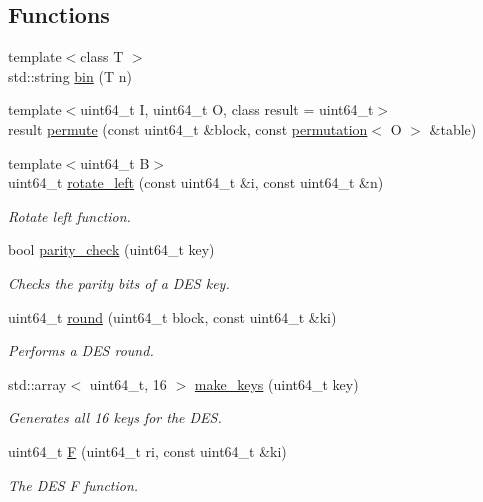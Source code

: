 \subsection*{Functions}
\begin{DoxyCompactItemize}
\item 
{\footnotesize template$<$class T $>$ }\\std\+::string \hyperlink{namespacedes64_1_1__internal_af81bec8ba2078259ef38dfb1950de3be}{bin} (T n)
\item 
{\footnotesize template$<$uint64\+\_\+t I, uint64\+\_\+t O, class result  = uint64\+\_\+t$>$ }\\result \hyperlink{namespacedes64_1_1__internal_a8a0bc78f468c93468b00ca7c5594a74a}{permute} (const uint64\+\_\+t \&block, const \hyperlink{namespacedes64_1_1__internal_a5b829bc1e22d70ed35b925f8971a88d3}{permutation}$<$ O $>$ \&table)
\item 
{\footnotesize template$<$uint64\+\_\+t B$>$ }\\uint64\+\_\+t \hyperlink{namespacedes64_1_1__internal_a41e4978bac83141046373b58c10aab2a}{rotate\+\_\+left} (const uint64\+\_\+t \&i, const uint64\+\_\+t \&n)
\begin{DoxyCompactList}\small\item\em Rotate left function. \end{DoxyCompactList}\item 
bool \hyperlink{namespacedes64_1_1__internal_ab820f987d21e8c13cf82b92da7c16f04}{parity\+\_\+check} (uint64\+\_\+t key)
\begin{DoxyCompactList}\small\item\em Checks the parity bits of a D\+ES key. \end{DoxyCompactList}\item 
uint64\+\_\+t \hyperlink{namespacedes64_1_1__internal_a4282083363bd055e073991d7f4648f47}{round} (uint64\+\_\+t block, const uint64\+\_\+t \&ki)
\begin{DoxyCompactList}\small\item\em Performs a D\+ES round. \end{DoxyCompactList}\item 
std\+::array$<$ uint64\+\_\+t, 16 $>$ \hyperlink{namespacedes64_1_1__internal_ae4c78065cbc23afe4cf03230a6ce7215}{make\+\_\+keys} (uint64\+\_\+t key)
\begin{DoxyCompactList}\small\item\em Generates all 16 keys for the D\+ES. \end{DoxyCompactList}\item 
uint64\+\_\+t \hyperlink{namespacedes64_1_1__internal_a8b8c4ad23172ef52296a16de0963fafb}{F} (uint64\+\_\+t ri, const uint64\+\_\+t \&ki)
\begin{DoxyCompactList}\small\item\em The D\+ES F function. \end{DoxyCompactList}\end{DoxyCompactItemize}
